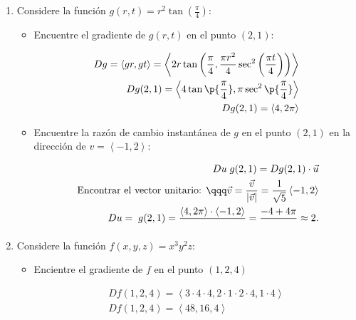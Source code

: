 \begin{enumerate}
    \item Considere la función $g(r,t)=r^2\tan\left(\frac{\pi}{4}\right)$:
        \begin{itemize}
            \item Encuentre el gradiente de $g(r,t)$ en el punto $(2,1)$:
            \begin{center}
               \begin{align*}
                   Dg = \left\langle gr,gt \right\rangle = \left\langle 2r\tan\left(\frac{\pi}{4}, \frac{\pi r^2}{4}\sec^2\left(\frac{\pi t}{4}\right)\right) \right\rangle \\ 
                   Dg(2,1) = \left\langle 4\tan\p{\frac{\pi}{4}}, \pi \sec ^2 \p{\frac{\pi}{4}} \right\rangle \\ 
                   Dg(2,1)= \left\langle 4,2\pi \right\rangle \\ 
               \end{align*}
            \end{center}
            
            \item Encuentre la razón de cambio instantánea de $g$ en el punto $(2,1)$ en la dirección de $v = \left\langle -1,2 \right\rangle $:
                \begin{center}
                   \begin{align*}
                       Du \;g(2,1) = Dg(2,1)\cdot \vec{u} \\ 
                       \text{ Encontrar el vector unitario:  } \qqq \vec{v} = \frac{\vec{v}}{\left| \vec{v} \right| } = \frac{1}{\sqrt{5}}\left\langle -1,2 \right\rangle  \\ 
                       Du = \; g(2,1) = \frac{\left\langle 4,2\pi \right\rangle \cdot \left\langle -1,2 \right\rangle }{} = \frac{-4+4\pi}{} \approx 2.  
                   \end{align*}
                \end{center}        
        \end{itemize}
    
    \item Considere la función $f(x,y,z)=x^3y^2z$:
        \begin{itemize}
            \item Encientre el gradiente de $f$ en el punto $(1,2,4)$
                \begin{center}
                   \begin{align*}
                       Df(1,2,4) = \left\langle 3\cdot 4 \cdot 4 ,2 \cdot 1 \cdot 2 \cdot 4, 1 \cdot 4 \right\rangle \\ 
                       Df(1,2,4) = \left\langle 48,16,4 \right\rangle \\ 
                   \end{align*}
                \end{center}
            

\end{itemize}
\end{enumerate}
